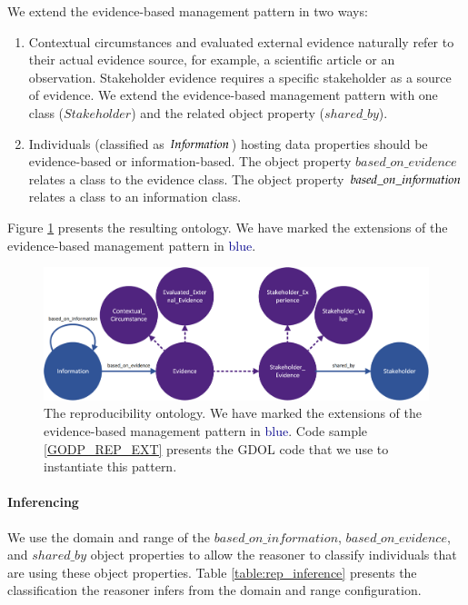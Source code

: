 We extend the evidence-based management pattern in two ways:
\begin{enumerate}
\item Contextual circumstances and evaluated external evidence naturally refer to their actual evidence source, for example, a scientific article or an observation. Stakeholder evidence requires a specific stakeholder as a source of evidence. We extend the evidence-based management pattern with one class ($Stakeholder$) and the related object property ($shared\_by$). 
\item Individuals (classified as $In{\mkern-2mu f\mkern-3mu}ormation$) hosting data properties should be evidence-based or information-based. The object property $based\_on\_evidence$ relates a class to the evidence class. The object property $based\_on\_in{\mkern-2mu f\mkern-3mu}ormation$ relates a class to an information class. 
\end{enumerate} 

Figure \ref{fig:reproducibility} presents the resulting ontology. We have marked the extensions of the evidence-based management pattern in \textcolor{DarkBlue}{blue}.

\begin{figure}[H]
\centering
  \includegraphics[width=14cm]{../../Images/04_Contribution/04_Reproducibility_Ontology.png}
  \caption{The reproducibility ontology. We have marked the extensions of the evidence-based management pattern in \textcolor{DarkBlue}{blue}. Code sample \ref{GODP_REP_EXT} presents the GDOL code that we use to instantiate this pattern.}
  \label{fig:reproducibility}
\end{figure}

\paragraph{Inferencing}
We use the domain and range of the $based\_on\_information$, $based\_on\_evidence$, and $shared\_by$ object properties to allow the reasoner to classify individuals that are using these object properties. Table \ref{table:rep_inference} presents the classification the reasoner infers from the domain and range configuration.

